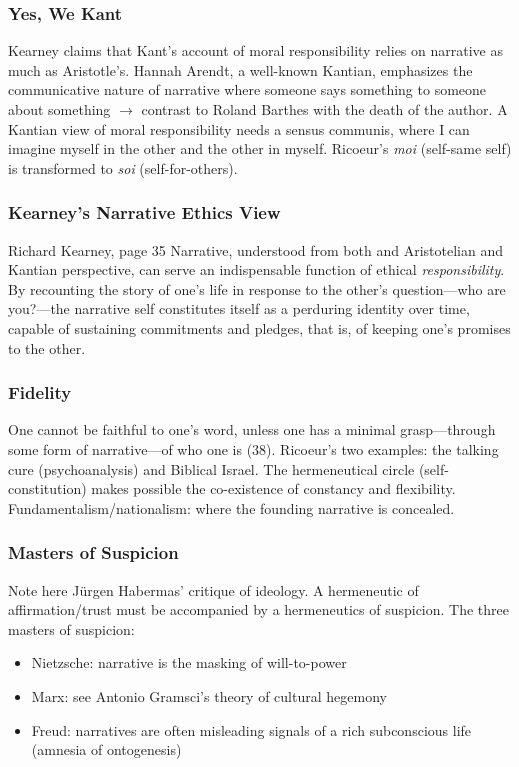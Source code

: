 \documentclass[xcolor=dvipsnames]{beamer}
\begin{document}
\begin{frame}
  \frametitle{Yes,  We Kant}
  Kearney claims that Kant's account of moral responsibility relies on
  narrative as much as Aristotle's. Hannah Arendt, a well-known
  Kantian, emphasizes the communicative nature of narrative where
  someone says something to someone about something $\longrightarrow$
  contrast to Roland Barthes with the death of the author. A Kantian
  view of moral responsibility needs a sensus communis, where I can
  imagine myself in the other and the other in myself. Ricoeur's
  \emph{moi} (self-same self) is transformed to \emph{soi}
  (self-for-others).
\end{frame}

\begin{frame}
  \frametitle{Kearney's Narrative Ethics View}
  \begin{block}{Richard Kearney, page 35}
    Narrative, understood from both and Aristotelian and Kantian
    perspective, can serve an indispensable function of ethical
    \emph{responsibility}. By recounting the story of one's life in
    response to the other's question---who are you?---the narrative
    self constitutes itself as a perduring identity over time, capable
    of sustaining commitments and pledges, that is, of keeping one's
    promises to the other.
  \end{block}
\end{frame}

\begin{frame}
  \frametitle{Fidelity}
  One cannot be faithful to one's word, unless one has a minimal
  grasp---through some form of narrative---of who one is (38).
  Ricoeur's two examples: the talking cure (psychoanalysis) and
  Biblical Israel. The hermeneutical circle (self-constitution) makes
  possible the co-existence of constancy and flexibility.
  Fundamentalism/nationalism: where the founding narrative is
  concealed.
\end{frame}

\begin{frame}
  \frametitle{Masters of Suspicion}
  Note here J{\"u}rgen Habermas' critique of ideology. A hermeneutic
  of affirmation/trust must be accompanied by a hermeneutics of
  suspicion. The three masters of suspicion:
  \begin{itemize}
  \item Nietzsche: narrative is the masking of will-to-power
  \item Marx: see Antonio Gramsci's theory of cultural hegemony
  \item Freud: narratives are often misleading signals of a rich
    subconscious life (amnesia of ontogenesis)
  \end{itemize}
\end{frame}
\end{document}

